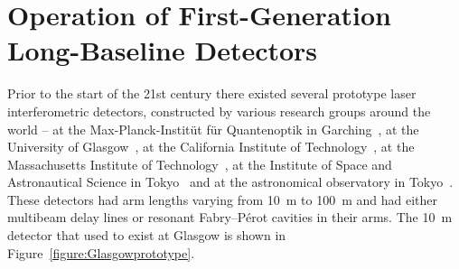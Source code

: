 \documentclass{article}
\begin{document}

\newpage

\section{Operation of First-Generation Long-Baseline Detectors}
\label{section:construction}

Prior to the start of the 21st century there existed several prototype
laser interferometric detectors, constructed by various research groups around
the world -- at the Max-Planck-Instit\"ut f\"ur Quantenoptik in
Garching~\cite{Shoemaker}, at the University of Glasgow~\cite{Robertson}, at the
California Institute of Technology~\cite{Abramovici}, at the Massachusetts
Institute of Technology~\cite{Fritschel2}, at the Institute of Space and
Astronautical Science in Tokyo~\cite{Mizuno} and at the astronomical observatory
in Tokyo~\cite{Araya}. These detectors had arm lengths varying from 10~m to
100~m and had either multibeam delay lines or resonant Fabry--P\'{e}rot cavities in
their arms. The 10~m detector that used to exist at Glasgow is shown in
Figure~\ref{figure:Glasgowprototype}.

\end{document}
